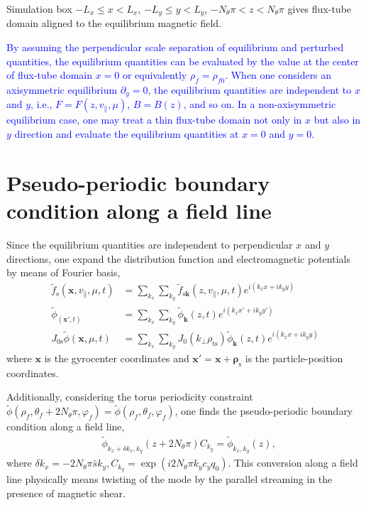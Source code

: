 Simulation box $-L_x \leq x < L_x$, $-L_y \leq y < L_y$, $-N_\theta \pi < z < N_\theta \pi$ gives flux-tube domain aligned to the equilibrium magnetic field. 

\textcolor{blue}{By assuming the perpendicular scale separation of equilibrium and perturbed quantities, the equilibrium quantities can be evaluated by the value at the center of flux-tube domain $x=0$ or equivalently $\rho_f = \rho_{f0}$. When one considers an axisymmetric equilibrium $\partial_y=0$, the equilibrium quantities are independent to $x$ and $y$, i.e., $F = F(z,v_\parallel,\mu)$, $B = B(z)$, and so on. In a non-axisymmetric equilibrium case, one may treat a thin flux-tube domain not only in $x$ but also in $y$ direction and evaluate the equilibrium quantities at $x=0$ and $y=0$.}





\section{Pseudo-periodic boundary condition along a field line}
\label{sec:Pseudo-periodic boundary condition along a field line}
Since the equilibrium quantities are independent to perpendicular $x$ and $y$ directions, one expand the distribution function and electromagnetic potentials by means of Fourier basis,
\begin{align}
  \tilde{f}_\mathrm{s}(\bm{x},v_\parallel,\mu,t) &= \sum_{k_x}\sum_{k_y} \tilde{f}_{\mathrm{s}\bm{k}} (z,v_\parallel,\mu,t) e^{i(k_xx+ik_yy)}\\
  \tilde{\phi}_(\bm{x}',t) &= \sum_{k_x}\sum_{k_y} \tilde{\phi}_{\bm{k}} (z,t) e^{i(k_xx'+ik_yy')}\\
  J_{0\mathrm{s}} \tilde{\phi}(\bm{x},\mu,t) &= \sum_{k_x}\sum_{k_y} J_0(k_\perp \rho_{\mathrm{ts}}) \tilde{\phi}_{\bm{k}} (z,t) e^{i(k_xx+ik_yy)}\end{align}
where $\bm{x}$ is the gyrocenter coordinates and $\bm{x}'=\bm{x}+\bm{\rho}_\mathrm{s}$ is the particle-position coordinates.

Additionally, considering the torus periodicity constraint $\tilde{\phi}(\rho_f,\theta_f+2N_\theta\pi,\varphi_f) = \tilde{\phi}(\rho_f,\theta_f,\varphi_f)$, one finds the pseudo-periodic boundary condition along a field line,
\begin{align}
  &\tilde{\phi}_{k_x+\delta k_x,k_y} (z+2N_\theta\pi) C_{k_y} = \tilde{\phi}_{k_x,k_y}(z),
  \label{eq:boundarycondition}
\end{align}
where $\delta k_x = -2N_\theta \pi \hat{s} k_y, C_{k_y} = \exp (i2N_\theta \pi k_y c_y q_0)$. This conversion along a field line physically means twisting of the mode by the parallel streaming in the presence of magnetic shear.





